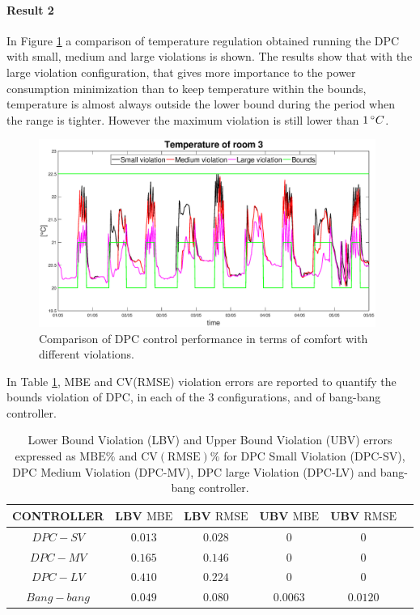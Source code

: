 \paragraph{Result 2} In Figure \ref{F:comparison_all_temperature} a comparison of temperature regulation obtained running the DPC with small, medium and large violations is shown. The results show that with the large violation configuration, that gives more importance to the power consumption minimization than to keep temperature within the bounds, temperature is almost always outside the lower bound during the period when the range is tighter. However the maximum violation is still lower than $1\,\degree C$.
\begin{figure}[h!]
	\begin{center}
		\includegraphics[width=26pc]{figures/Temperatures_all.eps}
	\end{center}
	\caption{Comparison of DPC control performance in terms of comfort with different violations.}
	\label{F:comparison_all_temperature}
\end{figure}
In Table \ref{T:violationErrors}, MBE and CV(RMSE) violation errors are reported to quantify the bounds violation of DPC, in each of the $3$ configurations, and of bang-bang controller.
\begin{table}[h!]
	\centering
		\begin{tabular}{cccccc}
			\toprule
			CONTROLLER  & LBV $\mathrm{MBE}$  & LBV $\mathrm{RMSE}$ & UBV $\mathrm{MBE}$ & UBV $\mathrm{RMSE}$ 	\\ 
			\midrule
			$DPC-SV$    & $0.013$             & $0.028$  			      & $0$    				 & $0$     	  	\\
			$DPC-MV$    & $0.165$ 			  & $0.146$     			  & $0$    				 & $0$		  	\\
			$DPC-LV$    & $0.410$  			  & $0.224$     			  & $0$    				 & $0$	      	\\
			$Bang-bang$ & $0.049$ 			  & $0.080$    				  & $0.0063$ 		     & $0.0120$	  	\\
			\bottomrule
		\end{tabular}
	\caption{Lower Bound Violation (LBV) and Upper Bound Violation (UBV) errors expressed as $\mathrm{MBE}\%$ and $\mathrm{CV(RMSE)}\%$ for DPC Small Violation (DPC-SV), DPC Medium Violation (DPC-MV), DPC large Violation (DPC-LV) and bang-bang controller.}
	\captionsetup{justification=centering}
	\label{T:violationErrors}
\end{table}
